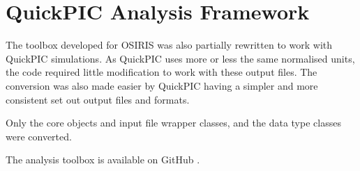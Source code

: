 \section{QuickPIC Analysis Framework}
\label{Tools:QA}

The toolbox developed for OSIRIS was also partially rewritten to work with QuickPIC simulations. As QuickPIC uses more or less the same normalised units, the code required little modification to work with these output files. The conversion was also made easier by QuickPIC having a simpler and more consistent set out output files and formats.

Only the core objects and input file wrapper classes, and the data type classes were converted.

The analysis toolbox is available on GitHub \cite{code:quickpic_analysis:2017}.
